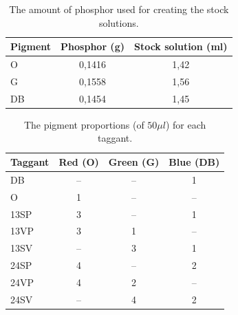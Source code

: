 \documentclass[thesis.tex]{subfiles}
\begin{document}
\begin{table}[ht]
  \caption{The amount of phosphor used for creating the stock solutions.}

  \begin{center}
  \begin{tabular}{| m{1.75cm} | c | c |}
    \hline
    \textbf{Pigment}  & \textbf{Phosphor (g)} & \textbf{Stock solution (ml)} \\ \hline
    O & 0,1416 & 1,42 \\
    \hline
    G & 0,1558 & 1,56 \\
    \hline
    DB & 0,1454 & 1,45 \\
    \hline
  \end{tabular}
  \end{center}
\end{table}
\vspace{-1.25em}
\begin{table}[ht]
  \caption{The pigment proportions (of $50\mu l$) for each taggant.}

  \begin{center}
  \begin{tabular}{| m{1.75cm} | c | c | c |}
    \hline
    \textbf{Taggant}  & \textbf{Red (O)} & \textbf{Green (G)} & \textbf{Blue (DB)} \\ \hline
    DB & -- & -- & 1 \\
    \hline
    O & 1 & -- & -- \\
    \hline
    13SP & 3 & -- & 1 \\
    \hline
    13VP & 3 & 1 & -- \\
    \hline
    13SV & -- & 3 & 1 \\
    \hline
    24SP & 4 & -- & 2 \\
    \hline
    24VP  & 4 & 2 & -- \\
    \hline
    24SV & -- & 4 & 2 \\
    \hline
  \end{tabular}
  \end{center}
\end{table}
\end{document}
